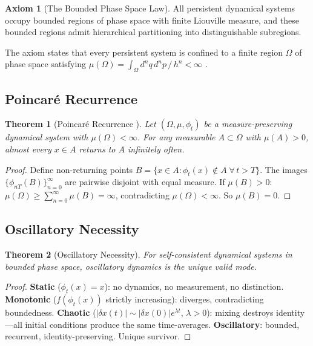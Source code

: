 \documentclass[11pt,twocolumn,a4paper]{article}
\newtheorem{theorem}{Theorem}[section]
\theoremstyle{definition}
\newtheorem{axiom}{Axiom}
\theoremstyle{remark}
\begin{document}
\begin{axiom}[The Bounded Phase Space Law]
\label{ax:bpsl}
All persistent dynamical systems occupy bounded regions of phase space with finite Liouville measure, and these bounded regions admit hierarchical partitioning into distinguishable subregions.
\end{axiom}

The axiom states that every persistent system is confined to a finite region $\Omega$ of phase space satisfying $\mu(\Omega) = \int_\Omega d^nq\,d^np\,/\,h^n < \infty$ \citep{planck1901}.

\subsection{Poincar\'e Recurrence}

\begin{theorem}[Poincar\'e Recurrence {\citep{poincare1890}}]
\label{thm:poincare}
Let $(\Omega, \mu, \phi_t)$ be a measure-preserving dynamical system with $\mu(\Omega) < \infty$. For any measurable $A \subset \Omega$ with $\mu(A) > 0$, almost every $x \in A$ returns to $A$ infinitely often.
\end{theorem}

\begin{proof}
Define non-returning points $B = \{x \in A : \phi_t(x) \notin A\;\forall\,t > T\}$. The images $\{\phi_{nT}(B)\}_{n=0}^\infty$ are pairwise disjoint with equal measure. If $\mu(B) > 0$: $\mu(\Omega) \geq \sum_{n=0}^\infty \mu(B) = \infty$, contradicting $\mu(\Omega) < \infty$. So $\mu(B) = 0$.
\end{proof}

\subsection{Oscillatory Necessity}

\begin{theorem}[Oscillatory Necessity]
\label{thm:oscillatory}
For self-consistent dynamical systems in bounded phase space, oscillatory dynamics is the unique valid mode.
\end{theorem}

\begin{proof}
\textbf{Static} ($\phi_t(x) = x$): no dynamics, no measurement, no distinction. \textbf{Monotonic} ($f(\phi_t(x))$ strictly increasing): diverges, contradicting boundedness. \textbf{Chaotic} ($|\delta x(t)| \sim |\delta x(0)|e^{\lambda t}$, $\lambda > 0$): mixing destroys identity---all initial conditions produce the same time-averages. \textbf{Oscillatory}: bounded, recurrent, identity-preserving. Unique survivor.
\end{proof}
\end{document}
